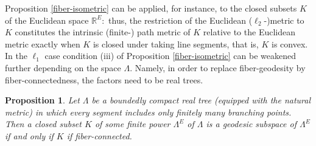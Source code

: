 \documentclass[11pt,a4paper]{amsart}
\newtheorem{proposition}{Proposition}
\theoremstyle{definition}
\numberwithin{equation}{section}
\begin{document}
 Proposition \ref{fiber-isometric} can be applied, for instance, to the closed subsets $K$ of the Euclidean space ${\mathbb R}^E:$ thus, the restriction
 of the Euclidean ($\ell_2$-)metric to $K$ constitutes the intrinsic (finite-) path metric of $K$ relative to the Euclidean metric exactly
 when $K$ is closed under taking line segments, that is, $K$ is convex. In the $\ell_1$ case condition (iii) of Proposition \ref{fiber-isometric}
 can be weakened further depending on the space $\Lambda$. Namely, in order to replace fiber-geodesity by fiber-connectedness, the factors need to be real trees.



\begin{proposition} \label{fiber-connected} Let  $\Lambda$ be a boundedly compact real tree (equipped with the natural metric) in which every segment includes only
finitely many branching points. Then a closed subset $K$ of some finite power ${\Lambda}^E$ of $\Lambda$ is a geodesic subspace of $\Lambda^E$ if and only
if $K$ if fiber-connected.
\end{proposition}
\end{document}
